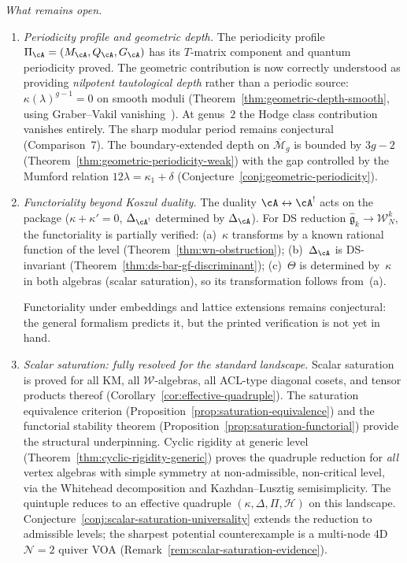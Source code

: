 \emph{What remains open.}
\begin{enumerate}[label=\textup{(\roman*)},start=3]
\item \emph{Periodicity profile and geometric depth.}
  The periodicity profile $\Pi_{\cA} = (M_{\cA}, Q_{\cA},
  G_{\cA})$ has its $T$-matrix component and quantum periodicity
  proved.  The geometric contribution is now correctly understood
  as providing \emph{nilpotent tautological depth} rather than a
  periodic source: $\kappa(\lambda)^{g-1} = 0$ on smooth moduli
  (Theorem~\ref{thm:geometric-depth-smooth}, using Graber--Vakil
  vanishing~\cite{GraVak05}).  At genus~$2$ the Hodge class
  contribution vanishes entirely.  The sharp modular period remains
  conjectural (Comparison~7).  The boundary-extended depth on
  $\overline{\mathcal{M}}_g$ is bounded by $3g - 2$
  (Theorem~\ref{thm:geometric-periodicity-weak}) with the
  gap controlled by the Mumford relation $12\lambda = \kappa_1 + \delta$
  (Conjecture~\ref{conj:geometric-periodicity}).

\item \emph{Functoriality beyond Koszul duality.}
  The duality $\cA \leftrightarrow \cA^!$ acts on the package
  ($\kappa + \kappa' = 0$, $\Delta_{\cA^!}$ determined by
  $\Delta_{\cA}$).  For DS reduction
  $\widehat{\mathfrak{g}}_k \to \mathcal{W}_N^k$, the
  functoriality is partially verified:
  (a)~$\kappa$ transforms by a known rational function of the level
  (Theorem~\ref{thm:wn-obstruction});
  (b)~$\Delta_{\cA}$ is DS-invariant
  (Theorem~\ref{thm:ds-bar-gf-discriminant});
  (c)~$\Theta$ is determined by~$\kappa$ in both algebras (scalar
  saturation), so its transformation follows from~(a).

  Functoriality under embeddings and lattice extensions remains
  conjectural: the general formalism predicts it, but the printed
  verification is not yet in hand.

\item \emph{Scalar saturation: fully resolved for the standard
  landscape.}
  Scalar saturation is proved for all KM, all $\mathcal{W}$-algebras,
  all ACL-type diagonal cosets, and tensor products thereof
  (Corollary~\ref{cor:effective-quadruple}).
  The saturation equivalence criterion
  (Proposition~\ref{prop:saturation-equivalence}) and the
  functorial stability theorem
  (Proposition~\ref{prop:saturation-functorial}) provide the
  structural underpinning.
  Cyclic rigidity at generic level
  (Theorem~\ref{thm:cyclic-rigidity-generic}) proves the
  quadruple reduction for \emph{all} vertex algebras with
  simple symmetry at non-admissible, non-critical level, via
  the Whitehead decomposition and Kazhdan--Lusztig
  semisimplicity.
  The quintuple reduces to an effective quadruple
  $(\kappa, \Delta, \Pi, \mathcal{H})$ on this landscape.
  Conjecture~\ref{conj:scalar-saturation-universality}
  extends the reduction to admissible levels; the sharpest
  potential counterexample is a
  multi-node 4D $\mathcal{N}=2$ quiver VOA
  (Remark~\ref{rem:scalar-saturation-evidence}).
\end{enumerate}

